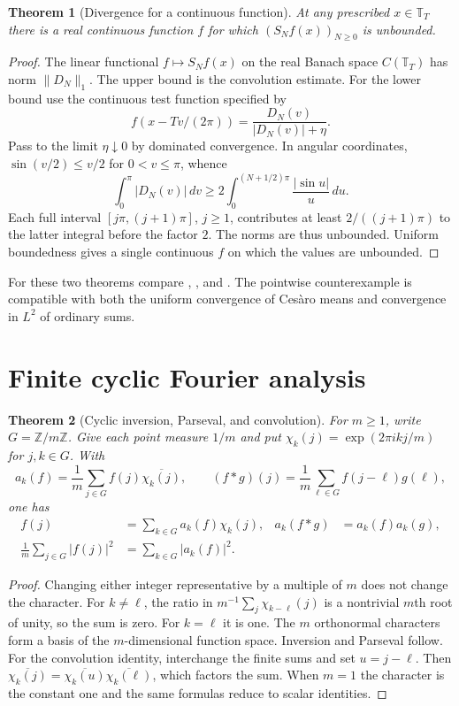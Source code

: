 \documentclass[11pt,oneside,openany]{book}
\newtheorem{theorem}{Theorem}[chapter]
\theoremstyle{definition}
\theoremstyle{remark}
\begin{document}
\begin{theorem}[Divergence for a continuous function]
\label{p102:U1-03}
At any prescribed $x\in\mathbb T_T$ there is a real continuous
function $f$ for which $(S_N f(x))_{N\ge0}$ is unbounded.
\end{theorem}

\begin{proof}
The linear functional $f\mapsto S_N f(x)$ on the real Banach space
$C(\mathbb T_T)$ has norm $\|D_N\|_1$. The upper bound is the
convolution estimate. For the lower bound use the continuous test
function specified by
\[
 f(x-Tv/(2\pi))=\frac{D_N(v)}{|D_N(v)|+\eta}.
\]
Pass to the limit $\eta\downarrow0$ by dominated convergence. In angular
coordinates, $\sin(v/2)\le v/2$ for $0<v\le\pi$, whence
\[
 \int_0^\pi |D_N(v)|\,dv\ge
   2\int_0^{(N+1/2)\pi}\frac{|\sin u|}{u}\,du .
\]
Each full interval $[j\pi,(j+1)\pi]$, $j\ge1$, contributes at least
$2/((j+1)\pi)$ to the latter integral before the factor $2$.
The norms are thus unbounded. Uniform boundedness gives a single
continuous $f$ on which the values are unbounded.
\end{proof}

For these two theorems compare \cite[Section~8.5]{folland},
\cite[Section~3.4]{grafakos}, and \cite[Chapter~3, Section~2]{stein-shakarchi}.
The pointwise counterexample is compatible with both the uniform
convergence of Ces\`aro means and convergence in $L^2$ of ordinary sums.

\section{Finite cyclic Fourier analysis}

\begin{theorem}[Cyclic inversion, Parseval, and convolution]
\label{p102:U1-05}
For $m\ge1$, write $G=\mathbb Z/m\mathbb Z$. Give each point
measure $1/m$ and put $\chi_k(j)=\exp(2\pi i kj/m)$ for $j,k\in G$.
With
\[
 a_k(f)=\frac1m\sum_{j\in G} f(j)\overline{\chi_k(j)},\qquad
 (f*g)(j)=\frac1m\sum_{\ell\in G}f(j-\ell)g(\ell),
\]
one has
\begin{align*}
 f(j)&=\sum_{k\in G}a_k(f)\chi_k(j),&
 a_k(f*g)&=a_k(f)a_k(g),\\
 \frac1m\sum_{j\in G}|f(j)|^2&=\sum_{k\in G}|a_k(f)|^2.
\end{align*}
\end{theorem}

\begin{proof}
Changing either integer representative by a multiple of $m$
does not change the character. For $k\ne\ell$, the ratio in
$m^{-1}\sum_j\chi_{k-\ell}(j)$ is a nontrivial $m$th root of unity,
so the sum is zero. For $k=\ell$ it is one. The $m$ orthonormal
characters form a basis of the $m$-dimensional function space.
Inversion and Parseval follow. For the convolution identity, interchange the
finite sums and set $u=j-\ell$. Then
$\overline{\chi_k(j)}=\overline{\chi_k(u)}\overline{\chi_k(\ell)}$,
which factors the sum. When $m=1$ the character is the constant
one and the same formulas reduce to scalar identities.
\end{proof}
\end{document}
